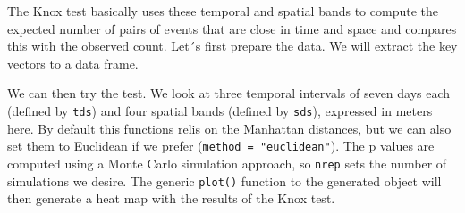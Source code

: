 \documentclass[
  krantz2]{krantz}
\makeatletter
\newenvironment{Shaded}{\begin{snugshade}}{\end{snugshade}}
\newcommand{\AttributeTok}[1]{\textcolor[rgb]{0.61,0.61,0.61}{#1}}
\newcommand{\DecValTok}[1]{\textcolor[rgb]{0.06,0.06,0.06}{#1}}
\newcommand{\FloatTok}[1]{\textcolor[rgb]{0.06,0.06,0.06}{#1}}
\newcommand{\FunctionTok}[1]{\textcolor[rgb]{0,0,0}{#1}}
\newcommand{\NormalTok}[1]{#1}
\newcommand{\OtherTok}[1]{\textcolor[rgb]{0.37,0.37,0.37}{#1}}
\newcommand{\SpecialCharTok}[1]{\textcolor[rgb]{0,0,0}{#1}}
\newenvironment{kframe}{%
\medskip{}
\setlength{\fboxsep}{.8em}
 \def\at@end@of@kframe{}%
 \ifinner\ifhmode%
  \def\at@end@of@kframe{\end{minipage}}%
  \begin{minipage}{\columnwidth}%
 \fi\fi%
 \def\FrameCommand##1{\hskip\@totalleftmargin \hskip-\fboxsep
 \colorbox{shadecolor}{##1}\hskip-\fboxsep
     \hskip-\linewidth \hskip-\@totalleftmargin \hskip\columnwidth}%
 \MakeFramed {\advance\hsize-\width
   \@totalleftmargin\z@ \linewidth\hsize
   \@setminipage}}%
 {\par\unskip\endMakeFramed%
 \at@end@of@kframe}
\renewenvironment{Shaded}{\begin{kframe}}{\end{kframe}}
\makeatother
\begin{document}
The Knox test basically uses these temporal and spatial bands to compute the expected number of pairs of events that are close in time and space and compares this with the observed count. Let´s first prepare the data. We will extract the key vectors to a data frame.

\begin{Shaded}
\end{Shaded}

We can then try the test. We look at three temporal intervals of seven days each (defined by \texttt{tds}) and four spatial bands (defined by \texttt{sds}), expressed in meters here. By default this functions relis on the Manhattan distances, but we can also set them to Euclidean if we prefer (\texttt{method\ =\ "euclidean"}). The p values are computed using a Monte Carlo simulation approach, so \texttt{nrep} sets the number of simulations we desire. The generic \texttt{plot()} function to the generated object will then generate a heat map with the results of the Knox test.

\begin{Shaded}
\end{Shaded}
\end{document}
